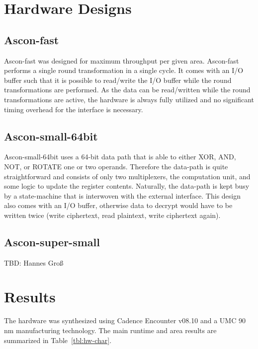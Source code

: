 \documentclass[runningheads]{llncs}
\begin{document}
\section{Hardware Designs}

\subsection{Ascon-fast}

Ascon-fast was designed for maximum throughput per given area. Ascon-fast performs a single round transformation in a single cycle. It comes with an I/O buffer such that it is possible to read/write the I/O buffer while the round transformations are performed. As the data can be read/written while the round transformations are active, the hardware is always fully utilized and no significant timing overhead for the interface is necessary. 

\subsection{Ascon-small-64bit}

Ascon-small-64bit uses a 64-bit data path that is able to either XOR, AND, NOT, or ROTATE one or two operands. Therefore the data-path is quite straightforward and consists of only two multiplexers, the computation unit, and some logic to update the register contents. Naturally, the data-path is kept busy by a state-machine that is interwoven with the external interface. This design also comes with an I/O buffer, otherwise data to decrypt would have to be written twice (write ciphertext, read plaintext, write ciphertext again). 

\subsection{Ascon-super-small}

TBD: Hannes Gro{\ss}

\section{Results} \label{sec:results}

The hardware was synthesized using Cadence Encounter v08.10 and a UMC 90\,nm manufacturing technology. The main runtime and area results are summarized in Table~\ref{tbl:hw-char}.
\end{document}
